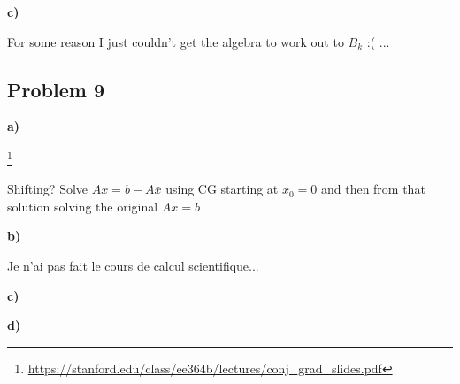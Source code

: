 \textbf{c)}

For some reason I just couldn't get the algebra to work out to $B_k$ :( ...

\subsection{Problem 9}

\textbf{a)}

\answer \footnote{\url{https://stanford.edu/class/ee364b/lectures/conj_grad_slides.pdf}}

Shifting? Solve $Ax = b - A\bar{x}$ using CG starting at $x_0 = 0$ and then from that solution solving the original $Ax = b$

\textbf{b)}

\answer

Je n'ai pas fait le cours de calcul scientifique...

\textbf{c)}

\incomplete

\textbf{d)}

\incomplete